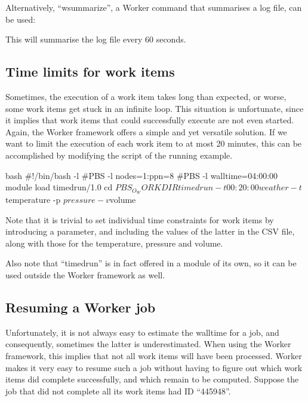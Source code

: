\begin{prompt}
\end{prompt}

Alternatively, ``wsummarize'', a Worker command that summarises a log file, can be used:

\begin{prompt}
\end{prompt}

This will summarise the log file every 60 seconds.

\subsection{Time limits for work items}

Sometimes, the execution of a work item takes long than expected, or worse,
some work items get stuck in an infinite loop. This situation is unfortunate,
since it implies that work items that could successfully execute are not even
started. Again, the Worker framework offers a simple and yet versatile
solution. If we want to limit the execution of each work item to at most 20
minutes, this can be accomplished by modifying the script of the running
example.

\begin{code}{bash}
#!/bin/bash -l
#PBS -l nodes=1:ppn=8
#PBS -l walltime=04:00:00
module load timedrun/1.0
cd $PBS_O_WORKDIR
timedrun -t 00:20:00 weather -t $temperature  -p $pressure  -v $volume
\end{code}

Note that it is trivial to set individual time constraints for work items by
introducing a parameter, and including the values of the latter in the CSV
file, along with those for the temperature, pressure and volume.

Also note that ``timedrun'' is in fact offered in a module of its own, so it can
be used outside the Worker framework as well.

\subsection{Resuming a Worker job}

Unfortunately, it is not always easy to estimate the walltime for a job, and
consequently, sometimes the latter is underestimated. When using the Worker
framework, this implies that not all work items will have been processed.
Worker makes it very easy to resume such a job without having to figure out
which work items did complete successfully, and which remain to be computed.
Suppose the job that did not complete all its work items had ID ``445948''.

